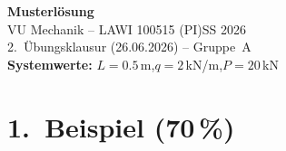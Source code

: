 \documentclass[a4paper,11pt]{article}
\begin{document}

\begin{center}
  {\Large\bfseries Musterlösung}\\[4pt]
  {\large VU Mechanik -- LAWI 100515 (PI)\quad SS 2026}\\[2pt]
  {\normalsize 2.~Übungsklausur (26.06.2026) -- Gruppe~A}\\[2pt]
  {\normalsize \textbf{Systemwerte:} $L = 0.5$\,m,\quad $q = 2$\,kN/m,\quad $P = 20$\,kN}
\end{center}

\section*{1.~Beispiel \hfill (70\,\%)}
\end{document}
